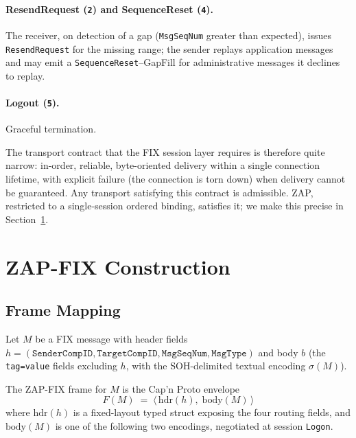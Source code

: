 \documentclass[11pt,a4paper]{article}
\begin{document}
\paragraph{ResendRequest (\texttt{2}) and SequenceReset (\texttt{4}).}
The receiver, on detection of a gap (\texttt{MsgSeqNum} greater than
expected), issues \texttt{ResendRequest} for the missing range; the
sender replays application messages and may emit a
\texttt{SequenceReset}--GapFill for administrative messages it
declines to replay.

\paragraph{Logout (\texttt{5}).}
Graceful termination.

The transport contract that the FIX session layer requires is
therefore quite narrow: in-order, reliable, byte-oriented delivery
within a single connection lifetime, with explicit failure (the
connection is torn down) when delivery cannot be guaranteed. Any
transport satisfying this contract is admissible. ZAP, restricted
to a single-session ordered binding, satisfies it; we make this
precise in Section~\ref{sec:construction}.

\section{ZAP-FIX Construction}
\label{sec:construction}

\subsection{Frame Mapping}

Let $M$ be a FIX message with header fields
$h = (\texttt{SenderCompID}, \texttt{TargetCompID},
\texttt{MsgSeqNum}, \texttt{MsgType})$
and body $b$ (the \texttt{tag=value} fields excluding $h$, with the
SOH-delimited textual encoding $\sigma(M)$).

The ZAP-FIX frame for $M$ is the Cap'n Proto envelope
\[
F(M) \;=\; \langle\, \mathrm{hdr}(h),\; \mathrm{body}(M)\, \rangle
\]
where $\mathrm{hdr}(h)$ is a fixed-layout typed struct exposing the
four routing fields, and $\mathrm{body}(M)$ is one of the following
two encodings, negotiated at session \texttt{Logon}.
\end{document}
